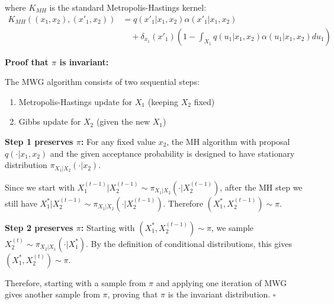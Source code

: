 where $K_{MH}$ is the standard Metropolis-Hastings kernel:
\begin{align*}
K_{MH}((x_1, x_2), (x'_1, x_2)) &= q(x'_1|x_1, x_2)\alpha(x'_1|x_1, x_2)\\
&\quad + \delta_{x_1}(x'_1)\left(1 - \int_{X_1} q(u_1|x_1, x_2)\alpha(u_1|x_1, x_2)du_1\right)
\end{align*}

\textbf{Proof that $\pi$ is invariant:}

The MWG algorithm consists of two sequential steps:
\begin{enumerate}
\item Metropolis-Hastings update for $X_1$ (keeping $X_2$ fixed)  
\item Gibbs update for $X_2$ (given the new $X_1$)
\end{enumerate}

\textbf{Step 1 preserves $\pi$:} 
For any fixed value $x_2$, the MH algorithm with proposal $q(\cdot|x_1, x_2)$ and the given acceptance probability is designed to have stationary distribution $\pi_{X_1|X_2}(\cdot|x_2)$. 

Since we start with $X_1^{(t-1)}|X_2^{(t-1)} \sim \pi_{X_1|X_2}(\cdot|X_2^{(t-1)})$, after the MH step we still have $X_1^*|X_2^{(t-1)} \sim \pi_{X_1|X_2}(\cdot|X_2^{(t-1)})$. Therefore $(X_1^*, X_2^{(t-1)}) \sim \pi$.

\textbf{Step 2 preserves $\pi$:} 
Starting with $(X_1^*, X_2^{(t-1)}) \sim \pi$, we sample $X_2^{(t)} \sim \pi_{X_2|X_1}(\cdot|X_1^*)$. By the definition of conditional distributions, this gives $(X_1^*, X_2^{(t)}) \sim \pi$.

Therefore, starting with a sample from $\pi$ and applying one iteration of MWG gives another sample from $\pi$, proving that $\pi$ is the invariant distribution. $\square$

